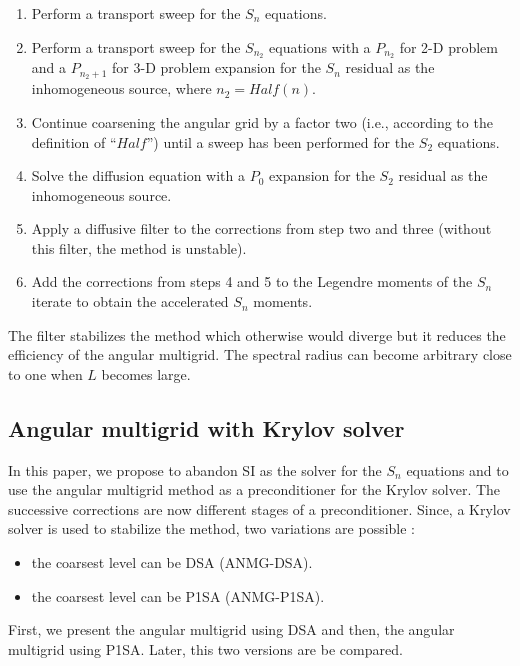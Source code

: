 \begin{enumerate}
\item Perform a transport sweep for the $S_n$ equations.
\item Perform a transport sweep for the $S_{n_2}$ equations with a $P_{n_2}$
for 2-D problem and a $P_{n_2+1}$ for 3-D problem expansion for the $S_n$
residual as the inhomogeneous source, where $n_2=Half(n)$.
\item Continue coarsening the angular grid by a factor two (i.e., according to the
definition of ``$Half$'') until a sweep has been performed for the $S_2$
equations.
\item Solve the diffusion equation with a $P_0$ expansion for the $S_2$
residual as the inhomogeneous source. 
\item Apply a diffusive filter to the corrections from step two and three (without
this filter, the method is unstable).
\item Add the corrections from steps 4 and 5 to the Legendre moments of the
$S_n$ iterate to obtain the accelerated $S_n$ moments.
\end{enumerate}
The filter stabilizes the method which otherwise would diverge but it reduces
the efficiency of the angular multigrid. The spectral radius can become
arbitrary close to one when $L$ becomes large.
\subsection{Angular multigrid with Krylov solver}
In this paper, we propose to abandon SI as the solver for the $S_n$ equations 
and to use the angular multigrid method as a preconditioner for the Krylov solver. 
The successive corrections
are now different stages of a preconditioner. Since, a Krylov solver is used to
stabilize the method, two variations are possible :
\begin{itemize}
\item the coarsest level can be DSA (ANMG-DSA).
\item the coarsest level can be P1SA (ANMG-P1SA).
\end{itemize}
First, we present the angular multigrid using DSA and then, the angular
multigrid using P1SA. Later, this two versions are be compared.
